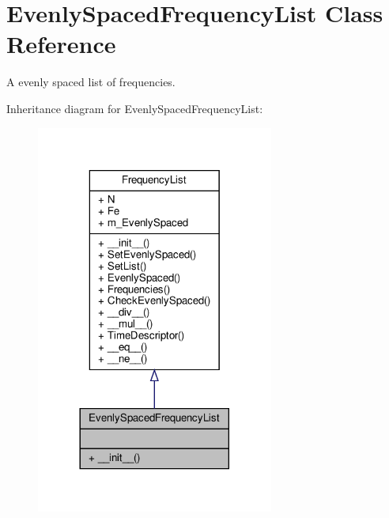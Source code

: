 \hypertarget{classSignalIntegrity_1_1FrequencyDomain_1_1FrequencyList_1_1EvenlySpacedFrequencyList}{}\section{Evenly\+Spaced\+Frequency\+List Class Reference}
\label{classSignalIntegrity_1_1FrequencyDomain_1_1FrequencyList_1_1EvenlySpacedFrequencyList}


A evenly spaced list of frequencies.  




Inheritance diagram for Evenly\+Spaced\+Frequency\+List\+:\nopagebreak
\begin{figure}[H]
\begin{center}
\leavevmode
\includegraphics[width=221pt]{classSignalIntegrity_1_1FrequencyDomain_1_1FrequencyList_1_1EvenlySpacedFrequencyList__inherit__graph}
\end{center}
\end{figure}


